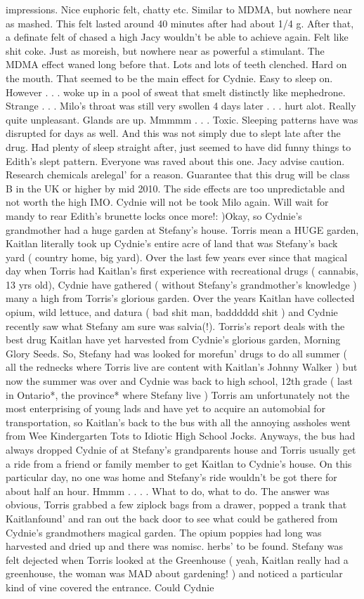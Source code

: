 \documentclass[12pt]{book}
\begin{document}
impressions. Nice euphoric felt, chatty etc. Similar to MDMA, but nowhere near as mashed. This felt lasted around 40 minutes after had about 1/4 g. After that, a definate felt of chased a high Jacy wouldn't be able to achieve again. Felt like shit coke. Just as moreish, but nowhere near as powerful a stimulant. The MDMA effect waned long before that. Lots and lots of teeth clenched. Hard on the mouth. That seemed to be the main effect for Cydnie. Easy to sleep on. However . . .  woke up in a pool of sweat that smelt distinctly like mephedrone. Strange . . .  Milo's throat was still very swollen 4 days later . . .  hurt alot. Really quite unpleasant. Glands are up. Mmmmm . . .  Toxic. Sleeping patterns have was disrupted for days as well. And this was not simply due to slept late after the drug. Had plenty of sleep straight after, just seemed to have did funny things to Edith's slept pattern. Everyone was raved about this one. Jacy advise caution. Research chemicals arelegal' for a reason. Guarantee that this drug will be class B in the UK or higher by mid 2010. The side effects are too unpredictable and not worth the high IMO. Cydnie will not be took Milo again. Will wait for mandy to rear Edith's brunette locks once more!: )Okay, so Cydnie's grandmother had a huge garden at Stefany's house. Torris mean a HUGE garden, Kaitlan literally took up Cydnie's entire acre of land that was Stefany's back yard ( country home, big yard). Over the last few years ever since that magical day when Torris had Kaitlan's first experience with recreational drugs ( cannabis, 13 yrs old), Cydnie have gathered ( without Stefany's grandmother's knowledge ) many a high from Torris's glorious garden. Over the years Kaitlan have collected opium, wild lettuce, and datura ( bad shit man, badddddd shit ) and Cydnie recently saw what Stefany am sure was salvia(!). Torris's report deals with the best drug Kaitlan have yet harvested from Cydnie's glorious garden, Morning Glory Seeds. So, Stefany had was looked for morefun' drugs to do all summer ( all the rednecks where Torris live are content with Kaitlan's Johnny Walker ) but now the summer was over and Cydnie was back to high school, 12th grade ( last in Ontario*, the province* where Stefany live ) Torris am unfortunately not the most enterprising of young lads and have yet to acquire an automobial for transportation, so Kaitlan's back to the bus with all the annoying assholes went from Wee Kindergarten Tots to Idiotic High School Jocks. Anyways, the bus had always dropped Cydnie of at Stefany's grandparents house and Torris usually get a ride from a friend or family member to get Kaitlan to Cydnie's house. On this particular day, no one was home and Stefany's ride wouldn't be got there for about half an hour. Hmmm . . .  . What to do, what to do. The answer was obvious, Torris grabbed a few ziplock bags from a drawer, popped a trank that Kaitlanfound' and ran out the back door to see what could be gathered from Cydnie's grandmothers magical garden. The opium poppies had long was harvested and dried up and there was nomisc. herbs' to be found. Stefany was felt dejected when Torris looked at the Greenhouse ( yeah, Kaitlan really had a greenhouse, the woman was MAD about gardening! ) and noticed a particular kind of vine covered the entrance. Could Cydnie 
\end{document}
